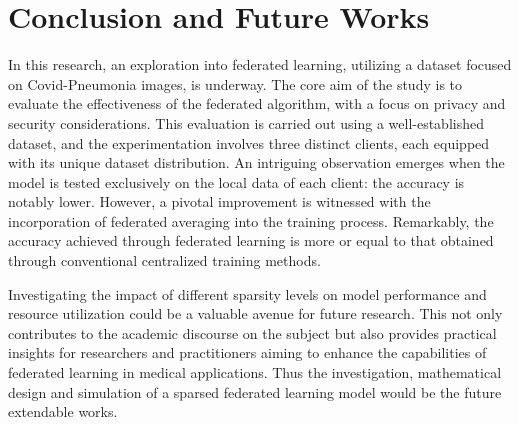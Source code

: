 \documentclass[conference]{IEEEtran}
\begin{document}
\section{Conclusion and Future Works}
In this research, an exploration into federated learning, utilizing a dataset focused on Covid-Pneumonia images, is underway. The core aim of the study is to evaluate the effectiveness of the federated algorithm, with a focus on privacy and security considerations. This evaluation is carried out using a well-established dataset, and the experimentation involves three distinct clients, each equipped with its unique dataset distribution. An intriguing observation emerges when the model is tested exclusively on the local data of each client: the accuracy is notably lower. However, a pivotal improvement is witnessed with the incorporation of federated averaging into the training process. Remarkably, the accuracy achieved through federated learning is more or equal to that obtained through conventional centralized training methods.

Investigating the impact of different sparsity levels on model performance and resource utilization could be a valuable avenue for future research. This not only contributes to the academic discourse on the subject but also provides practical insights for researchers and practitioners aiming to enhance the capabilities of federated learning in medical applications. Thus the investigation, mathematical design and simulation of a sparsed federated learning model would be the future extendable works.
\end{document}

